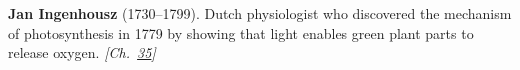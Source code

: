 \textbf{Jan Ingenhousz} (1730–1799). Dutch physiologist who discovered the mechanism of photosynthesis in 1779 by showing that light enables green plant parts to release oxygen. \emph{[Ch.~\hyperref[ch:treesfromair]{35}]}

